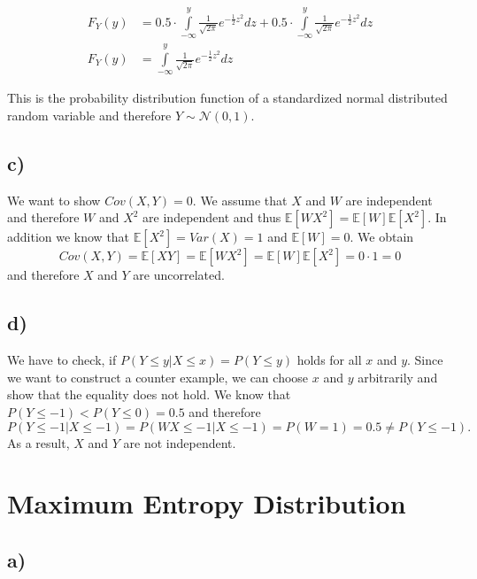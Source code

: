 \documentclass[paper=a4,fontsize=10pt,DIV11,BCOR10mm]{scrartcl}
\begin{document}
\begin{align*}
F_Y(y)&= 0.5 \cdot \int\limits_{-\infty}^{y} \frac{1}{\sqrt{2 \pi}} e^{-\frac{1}{2}z^2}dz+ 0.5 \cdot \int\limits_{-\infty}^{y} \frac{1}{\sqrt{2 \pi}} e^{-\frac{1}{2}z^2}dz\\
F_Y(y)&= \int\limits_{-\infty}^{y} \frac{1}{\sqrt{2 \pi}} e^{-\frac{1}{2}z^2}dz
\end{align*}

This is the probability distribution function of a standardized normal distributed random variable and therefore $Y\sim\mathcal{N}(0,1)$.

\subsection*{c)}
We want to show $Cov(X,Y)=0$. We assume that $X$ and $W$ are independent and therefore $W$ and $X^2$ are independent and thus $\mathbb{E}[WX^2]=\mathbb{E}[W]\mathbb{E}[X^2]$. In addition we know that $\mathbb{E}[X^2]=Var(X)=1$ and $\mathbb{E}[W]=0$. We obtain
\begin{equation*}
Cov(X,Y)=\mathbb{E}[XY]=\mathbb{E}[WX^2]=\mathbb{E}[W]\mathbb{E}[X^2]=0\cdot 1=0
\end{equation*}
and therefore $X$ and $Y$ are uncorrelated.


\subsection*{d)}
We have to check, if $P(Y\leq y|X \leq x)=P(Y \leq y)$ holds for all $x$ and $y$. Since we want to construct a counter example, we can choose $x$ and $y$ arbitrarily and show that the equality does not hold. We know that $ P(Y \leq -1)<P(Y \leq 0)=0.5$ and therefore
\begin{equation*}
P(Y\leq -1|X \leq -1)=P(WX \leq -1|X\leq -1)=P(W=1)=0.5\neq P(Y \leq -1).
\end{equation*}
As a result, $X$ and $Y$ are not independent.



\section{Maximum Entropy Distribution}

\subsection*{a)}
\end{document}
